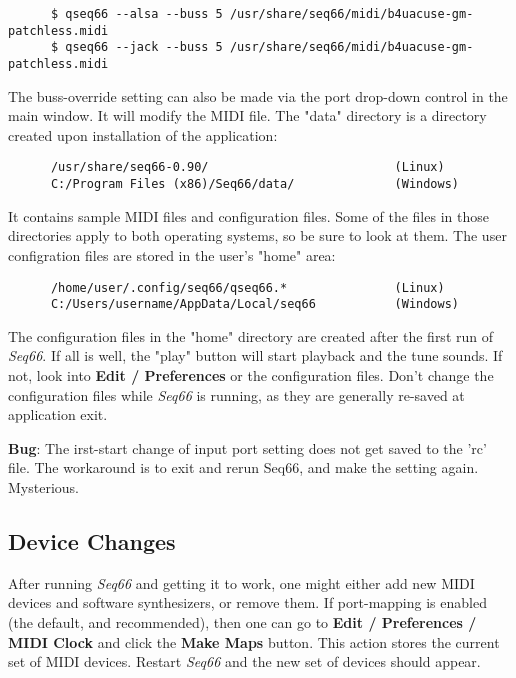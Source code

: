   \begin{verbatim}
      $ qseq66 --alsa --buss 5 /usr/share/seq66/midi/b4uacuse-gm-patchless.midi
      $ qseq66 --jack --buss 5 /usr/share/seq66/midi/b4uacuse-gm-patchless.midi
   \end{verbatim}

   The buss-override setting can also be made via the port drop-down control
   in the main window. It will modify the MIDI file.
   The "data" directory is a directory created upon installation of the
   application:

   \begin{verbatim}
      /usr/share/seq66-0.90/                          (Linux)
      C:/Program Files (x86)/Seq66/data/              (Windows)
   \end{verbatim}

   It contains sample MIDI files and configuration files.
   Some of the files in those directories apply to both operating systems, so
   be sure to look at them.
   The user configration files are stored in the user's "home" area:

   \begin{verbatim}
      /home/user/.config/seq66/qseq66.*               (Linux)
      C:/Users/username/AppData/Local/seq66           (Windows)
   \end{verbatim}

   The configuration files in the "home" directory
   are created after the first run of \textsl{Seq66}.
   If all is well, the "play" button will start playback and the tune sounds.
   If not, look into \textbf{Edit / Preferences} or the configuration files.
   Don't change the configuration files while \textsl{Seq66} is running, as
   they are generally re-saved at application exit.

   \textbf{Bug}:
      The irst-start change of input port setting does not get saved
      to the 'rc' file. The workaround is to exit and rerun Seq66, and
      make the setting again. Mysterious.

\subsection{Device Changes}
\label{subsec:introduction_device_changes}

   After running \textsl{Seq66} and getting it to work, one might
   either add new MIDI devices and software synthesizers, or remove
   them.
   If port-mapping is enabled (the default, and recommended), then
   one can go to
   \textbf{Edit / Preferences / MIDI Clock} and
   click the \textbf{Make Maps} button.
   This action stores the current set of MIDI devices.
   Restart \textsl{Seq66} and the new set of devices should appear.

